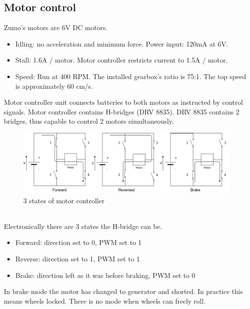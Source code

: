 \documentclass[11pt,a4paper,oneside,article]{memoir}
\begin{document}
\subsection{Motor control}
Zumo's motors are 6V DC motors.
\begin{itemize}
	\item Idling: no acceleration and minimum force. Power input: 120mA at 6V.
	\item Stall: 1.6A / motor. Motor controller restricts current to 1.5A / motor.
	\item Speed: Run at 400 RPM. The installed gearbox's ratio is 75:1. The top speed is approximately 60 cm/s.
\end{itemize}
Motor controller unit connects batteries to both motors as instructed by control signals. Motor controller contains H-bridges (DRV 8835). DRV 8835 contains 2 bridges, thus capable to control 2 motors simultaneously.\\
\begin{figure}[h]
	\centering
	\includegraphics[width=15cm]{illustration/H-bridge}
	\caption{3 states of motor controller}
	\label{fig:h-bridge}
\end{figure}\\
Electronically there are 3 states the H-bridge can be.
\begin{itemize}
	\item Forward: direction set to 0, PWM set to 1
	\item Reverse: direction set to 1, PWM set to 1
	\item Brake: direction left as it was before braking, PWM set to 0
\end{itemize}
In brake mode the motor has changed to generator and shorted. In practice this means wheels locked. There is no mode when wheels can freely roll.
\cite{Lectures}
\end{document}
